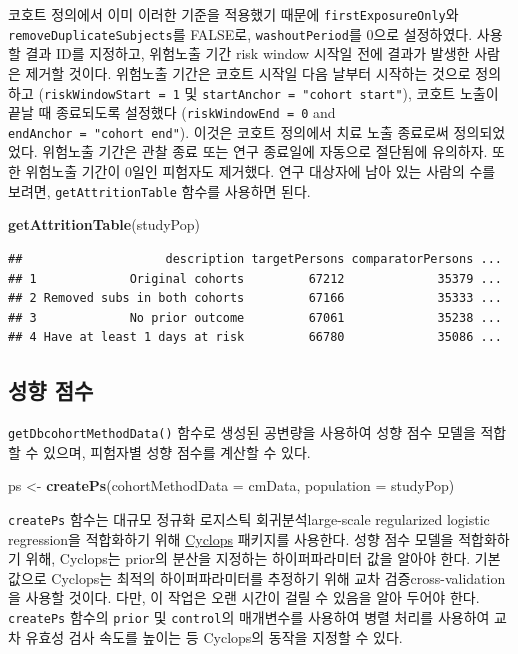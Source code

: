 \documentclass[10.5pt]{book}
\newenvironment{Shaded}{\begin{snugshade}}{\end{snugshade}}
\newcommand{\KeywordTok}[1]{\textcolor[rgb]{0.13,0.29,0.53}{\textbf{#1}}}
\newcommand{\DataTypeTok}[1]{\textcolor[rgb]{0.13,0.29,0.53}{#1}}
\newcommand{\StringTok}[1]{\textcolor[rgb]{0.31,0.60,0.02}{#1}}
\newcommand{\NormalTok}[1]{#1}
\theoremstyle{definition}
\theoremstyle{definition}
\theoremstyle{definition}
\theoremstyle{remark}
\begin{document}
코호트 정의에서 이미 이러한 기준을 적용했기 때문에
\texttt{firstExposureOnly}와 \texttt{removeDuplicateSubjects}를 FALSE로,
\texttt{washoutPeriod}를 0으로 설정하였다. 사용할 결과 ID를 지정하고,
위험노출 기간 risk window 시작일 전에 결과가 발생한 사람은 제거할
것이다. 위험노출 기간은 코호트 시작일 다음 날부터 시작하는 것으로
정의하고 (\texttt{riskWindowStart\ =\ 1} 및
\texttt{startAnchor\ =\ "cohort\ start"}), 코호트 노출이 끝날 때
종료되도록 설정했다 (\texttt{riskWindowEnd\ =\ 0} and
\texttt{endAnchor\ =\ "cohort\ end"}). 이것은 코호트 정의에서 치료 노출
종료로써 정의되었었다. 위험노출 기간은 관찰 종료 또는 연구 종료일에
자동으로 절단됨에 유의하자. 또한 위험노출 기간이 0일인 피험자도
제거했다. 연구 대상자에 남아 있는 사람의 수를 보려면,
\texttt{getAttritionTable} 함수를 사용하면 된다.

\begin{Shaded}
\begin{Highlighting}[]
\KeywordTok{getAttritionTable}\NormalTok{(studyPop)}
\end{Highlighting}
\end{Shaded}

\begin{verbatim}
##                    description targetPersons comparatorPersons ...
## 1             Original cohorts         67212             35379 ...
## 2 Removed subs in both cohorts         67166             35333 ...
## 3             No prior outcome         67061             35238 ...
## 4 Have at least 1 days at risk         66780             35086 ...
\end{verbatim}

\subsection{성향 점수}\label{--1}

\texttt{getDbcohortMethodData()} 함수로 생성된 공변량을 사용하여 성향
점수 모델을 적합할 수 있으며, 피험자별 성향 점수를 계산할 수 있다.

\begin{Shaded}
\begin{Highlighting}[]
\NormalTok{ps <-}\StringTok{ }\KeywordTok{createPs}\NormalTok{(}\DataTypeTok{cohortMethodData =}\NormalTok{ cmData, }\DataTypeTok{population =}\NormalTok{ studyPop)}
\end{Highlighting}
\end{Shaded}

\texttt{createPs} 함수는 대규모 정규화 로지스틱 회귀분석large-scale
regularized logistic regression을 적합화하기 위해
\href{https://ohdsi.github.io/Cyclops/}{Cyclops} 패키지를 사용한다. 성향
점수 모델을 적합화하기 위해, Cyclops는 prior의 분산을 지정하는
하이퍼파라미터 값을 알아야 한다. 기본 값으로 Cyclops는 최적의
하이퍼파라미터를 추정하기 위해 교차 검증cross-validation을 사용할
것이다. 다만, 이 작업은 오랜 시간이 걸릴 수 있음을 알아 두어야 한다.
\texttt{createPs} 함수의 \texttt{prior} 및 \texttt{control}의 매개변수를
사용하여 병렬 처리를 사용하여 교차 유효성 검사 속도를 높이는 등
Cyclops의 동작을 지정할 수 있다.
\end{document}
